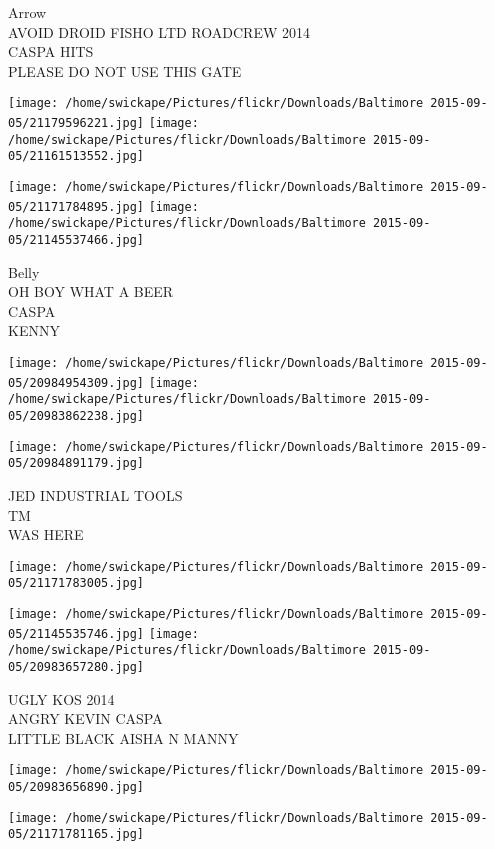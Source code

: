 \documentclass[10pt,letterpaper]{article}
\begin{document}
Arrow\\
AVOID DROID FISHO LTD ROADCREW 2014\\
CASPA HITS\\
PLEASE DO NOT USE THIS GATE\\
\pagebreak

\texttt{[image: /home/swickape/Pictures/flickr/Downloads/Baltimore 2015-09-05/21179596221.jpg]}
\texttt{[image: /home/swickape/Pictures/flickr/Downloads/Baltimore 2015-09-05/21161513552.jpg]}

\texttt{[image: /home/swickape/Pictures/flickr/Downloads/Baltimore 2015-09-05/21171784895.jpg]}
\texttt{[image: /home/swickape/Pictures/flickr/Downloads/Baltimore 2015-09-05/21145537466.jpg]}

Belly\\
OH BOY WHAT A BEER\\
CASPA\\
KENNY\\
\pagebreak

\texttt{[image: /home/swickape/Pictures/flickr/Downloads/Baltimore 2015-09-05/20984954309.jpg]}
\texttt{[image: /home/swickape/Pictures/flickr/Downloads/Baltimore 2015-09-05/20983862238.jpg]}

\texttt{[image: /home/swickape/Pictures/flickr/Downloads/Baltimore 2015-09-05/20984891179.jpg]}

JED INDUSTRIAL TOOLS\\
TM\\
WAS HERE\\
\pagebreak

\texttt{[image: /home/swickape/Pictures/flickr/Downloads/Baltimore 2015-09-05/21171783005.jpg]}

\vspace{0.25in}
\texttt{[image: /home/swickape/Pictures/flickr/Downloads/Baltimore 2015-09-05/21145535746.jpg]}
\texttt{[image: /home/swickape/Pictures/flickr/Downloads/Baltimore 2015-09-05/20983657280.jpg]}

UGLY KOS 2014\\
ANGRY KEVIN CASPA\\
LITTLE BLACK AISHA N MANNY\\
\pagebreak

\texttt{[image: /home/swickape/Pictures/flickr/Downloads/Baltimore 2015-09-05/20983656890.jpg]}

\vspace{0.25in}
\texttt{[image: /home/swickape/Pictures/flickr/Downloads/Baltimore 2015-09-05/21171781165.jpg]}
\end{document}
